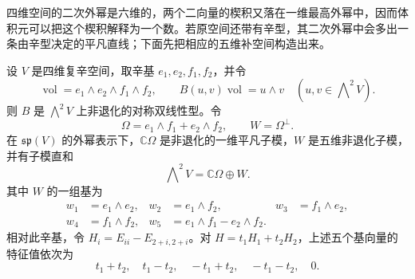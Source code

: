 四维空间的二次外幂是六维的，两个二向量的楔积又落在一维最高外幂中，因而体积元可以把这个楔积解释为一个数。若原空间还带有辛型，其二次外幂中会多出一条由辛型决定的平凡直线；下面先把相应的五维补空间构造出来。

\begin{proposition}\label{b5:prop:sp4-primitive-wedge}
	设 \(V\) 是四维复辛空间，取辛基 \(e_1,e_2,f_1,f_2\)，并令
	\[
		\operatorname{vol}=e_1\wedge e_2\wedge f_1\wedge f_2,\qquad B(u,v)\operatorname{vol}=u\wedge v \quad(u,v\in\bigwedge\nolimits^2V).
	\]
	则 \(B\) 是 \(\bigwedge^2V\) 上非退化的对称双线性型。令
	\[
		\Omega=e_1\wedge f_1+e_2\wedge f_2,\qquad W=\Omega^\perp.
	\]
	在 \(\mathfrak{sp}(V)\) 的外幂表示下，\(\mathbb C\Omega\) 是非退化的一维平凡子模，\(W\) 是五维非退化子模，并有子模直和
	\[
		\bigwedge\nolimits^2V=\mathbb C\Omega\oplus W.
	\]
	其中 \(W\) 的一组基为
	\[
		\begin{aligned}
			w_1&=e_1\wedge e_2,&w_2&=e_1\wedge f_2,&w_3&=f_1\wedge e_2,\\
			w_4&=f_1\wedge f_2,&w_5&=e_1\wedge f_1-e_2\wedge f_2.
		\end{aligned}
	\]
	相对此辛基，令 \(H_i=E_{ii}-E_{2+i,2+i}\)。对 \(H=t_1H_1+t_2H_2\)，上述五个基向量的特征值依次为
	\[
		t_1+t_2,\quad t_1-t_2,\quad -t_1+t_2,\quad -t_1-t_2,\quad0.
	\]
\end{proposition}
